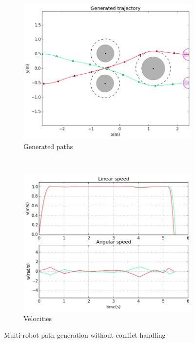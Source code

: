 \begin{figure}[!h]
        \centering
        ~ %
        \begin{subfigure}[b]{0.48\textwidth}
                \includegraphics[width=\textwidth]{./images/pwc.png}
                \caption{Generated paths}\label{fig:pwc}
        \end{subfigure}
        ~ %
        \begin{subfigure}[b]{0.48\textwidth}
                \includegraphics[width=\textwidth]{./images/vwc.png}
                \caption{Velocities}\label{fig:vwc}
        \end{subfigure}
        \caption{Multi-robot path generation without conflict handling}\label{fig:wc}
\end{figure}

